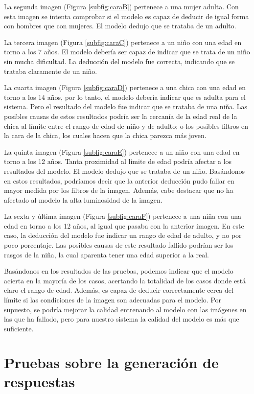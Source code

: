 La segunda imagen (Figura \ref{subfig:caraB}) pertenece a una mujer adulta. Con esta imagen se intenta comprobar si el modelo es capaz de deducir de igual forma con hombres que con mujeres. El modelo dedujo que se trataba de un adulto.

La tercera imagen (Figura \ref{subfig:caraC}) pertenece a un niño con una edad en torno a los 7 años. El modelo debería ser capaz de indicar que se trata de un niño sin mucha dificultad. La deducción del modelo fue correcta, indicando que se trataba claramente de un niño.

La cuarta imagen (Figura \ref{subfig:caraD}) pertenece a una chica con una edad en torno a los 14 años, por lo tanto, el modelo debería indicar que es adulta para el sistema. Pero el resultado del modelo fue indicar que se trataba de una niña. Las posibles causas de estos resultados podría ser la cercanía de la edad real de la chica al límite entre el rango de edad de niño y de adulto; o los posibles filtros en la cara de la chica, los cuales hacen que la chica parezca más joven.

La quinta imagen (Figura \ref{subfig:caraE}) pertenece a un niño con una edad en torno a los 12 años. Tanta proximidad al límite de edad podría afectar a los resultados del modelo. El modelo dedujo que se trataba de un niño. Basándonos en estos resultados, podríamos decir que la anterior deducción pudo fallar en mayor medida por los filtros de la imagen. Además, cabe destacar que no ha afectado al modelo la alta luminosidad de la imagen.

La sexta y última imagen (Figura \ref{subfig:caraF}) pertenece a una niña con una edad en torno a los 12 años, al igual que pasaba con la anterior imagen. En este caso, la deducción del modelo fue indicar un rango de edad de adulto, y no por poco porcentaje. Las posibles causas de este resultado fallido podrían ser los rasgos de la niña, la cual aparenta tener una edad superior a la real.

Basándonos en los resultados de las pruebas, podemos indicar que el modelo acierta en la mayoría de los casos, acertando la totalidad de los casos donde está claro el rango de edad. Además, es capaz de deducir correctamente cerca del límite si las condiciones de la imagen son adecuadas para el modelo. Por supuesto, se podría mejorar la calidad entrenando al modelo con las imágenes en las que ha fallado, pero para nuestro sistema la calidad del modelo es más que suficiente.


\section{Pruebas sobre la generación de respuestas}

